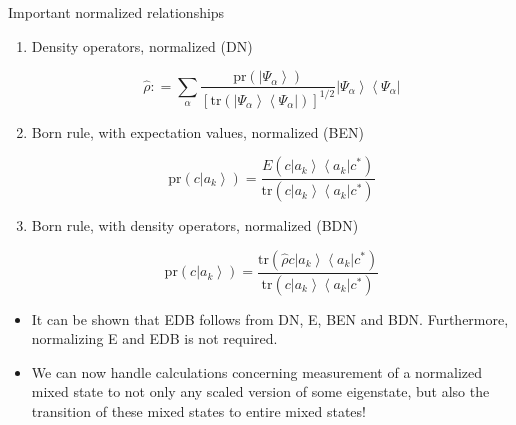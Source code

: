 \documentclass[9pt,handout]{beamer}
\newcommand{\pr}[0]{\text{pr}}
\newcommand{\tr}[0]{\text{tr}}
\begin{document}
\begin{frame}{}
\begin{block}{Important normalized relationships}
\begin{enumerate}
\item Density operators, normalized (DN)

$$\widehat{\rho} : = \sum_\alpha \frac{\pr \left( \left\lvert \Psi_\alpha \right\rangle \right)}{\left[ \tr \left( \left\lvert \Psi_\alpha \right\rangle \left\langle \Psi_\alpha \right\rvert \right) \right]^{1/2}} \left\lvert \Psi_\alpha \right\rangle \left\langle \Psi_\alpha \right\rvert$$

\item Born rule, with expectation values, normalized (BEN)

$$\pr \left( c \left\lvert a_k \right\rangle \right) = \frac{E \left( c \left\lvert a_k \right\rangle \left\langle a_k \right\rvert c^* \right)}{\tr \left( c \left\lvert a_k \right\rangle \left\langle a_k \right\rvert c^* \right)}$$

\item Born rule, with density operators, normalized (BDN)

$$\pr \left( c \left\lvert a_k \right\rangle \right) = \frac{\tr \left( \widehat{\rho} c \left\lvert a_k \right\rangle \left\langle a_k \right\rvert c^* \right)}{\tr \left( c \left\lvert a_k \right\rangle \left\langle a_k \right\rvert c^* \right)}$$
\end{enumerate}
\end{block}

\begin{itemize}
\item It can be shown that EDB follows from DN, E, BEN and BDN. Furthermore, normalizing E and EDB is not required.

\item We can now handle calculations concerning measurement of a normalized mixed state to not only any scaled version of some eigenstate, but also the transition of these mixed states to entire mixed states!
\end{itemize}
\end{frame}
\end{document}
